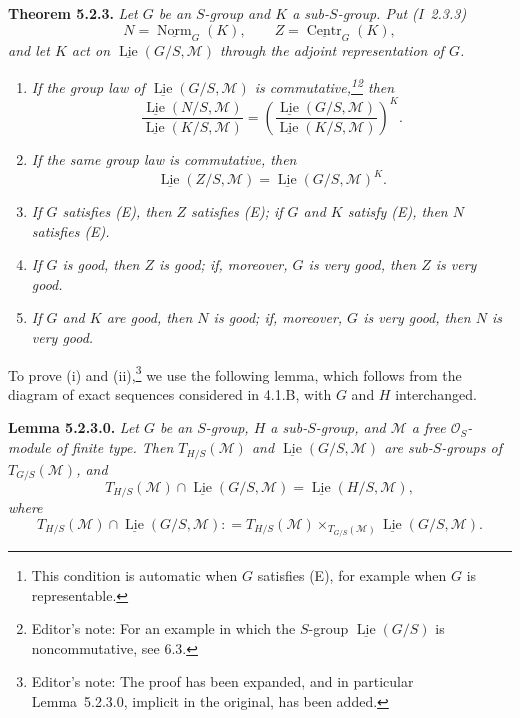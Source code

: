 \medskip
\noindent\textbf{Theorem 5.2.3.}
\textit{Let \(G\) be an \(S\)-group and \(K\) a sub-\(S\)-group. Put
(I~2.3.3)}
\[
 N=\underline{\operatorname{Norm}}_G(K),
 \qquad
 Z=\underline{\operatorname{Centr}}_G(K),
\]
\textit{and let \(K\) act on
\(\underline{\operatorname{Lie}}(G/S,\mathscr M)\) through the adjoint
representation of \(G\).}
\begin{enumerate}
\renewcommand{\labelenumi}{(\roman{enumi})}
\item \textit{If the group law of
\(\underline{\operatorname{Lie}}(G/S,\mathscr M)\) is
commutative,\footnote{This condition is automatic when \(G\) satisfies
(E), for example when \(G\) is representable.}\footnote{Editor's note:
For an example in which the \(S\)-group
\(\underline{\operatorname{Lie}}(G/S)\) is noncommutative, see 6.3.}
then}
\[
 \frac{\underline{\operatorname{Lie}}(N/S,\mathscr M)}
      {\underline{\operatorname{Lie}}(K/S,\mathscr M)}
 =
 \left(
 \frac{\underline{\operatorname{Lie}}(G/S,\mathscr M)}
      {\underline{\operatorname{Lie}}(K/S,\mathscr M)}
 \right)^K .
\]
\item \textit{If the same group law is commutative, then}
\[
 \underline{\operatorname{Lie}}(Z/S,\mathscr M)
   =\underline{\operatorname{Lie}}(G/S,\mathscr M)^K .
\]
\item \textit{If \(G\) satisfies (E), then \(Z\) satisfies (E); if
\(G\) and \(K\) satisfy (E), then \(N\) satisfies (E).}
\item \textit{If \(G\) is good, then \(Z\) is good; if, moreover,
\(G\) is very good, then \(Z\) is very good.}
\item \textit{If \(G\) and \(K\) are good, then \(N\) is good; if,
moreover, \(G\) is very good, then \(N\) is very good.}
\end{enumerate}

To prove (i) and (ii),\footnote{Editor's note: The proof has been
expanded, and in particular Lemma~5.2.3.0, implicit in the original,
has been added.} we use the following lemma, which follows from the
diagram of exact sequences considered in 4.1.B, with \(G\) and \(H\)
interchanged.

\medskip
\noindent\textbf{Lemma 5.2.3.0.}
\textit{Let \(G\) be an \(S\)-group, \(H\) a sub-\(S\)-group, and
\(\mathscr M\) a free \(\mathscr O_S\)-module of finite type. Then
\(T_{H/S}(\mathscr M)\) and
\(\underline{\operatorname{Lie}}(G/S,\mathscr M)\) are sub-\(S\)-groups
of \(T_{G/S}(\mathscr M)\), and}
\[
 T_{H/S}(\mathscr M)\cap
 \underline{\operatorname{Lie}}(G/S,\mathscr M)
 =
 \underline{\operatorname{Lie}}(H/S,\mathscr M),
\]
\textit{where}
\[
 T_{H/S}(\mathscr M)\cap
 \underline{\operatorname{Lie}}(G/S,\mathscr M)
 \mathrel{\mathop:}=
 T_{H/S}(\mathscr M)\times_{T_{G/S}(\mathscr M)}
 \underline{\operatorname{Lie}}(G/S,\mathscr M).
\]

